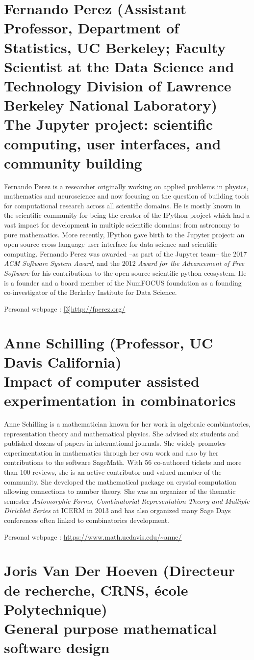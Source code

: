 \documentclass[12pt]{paper}
\newcommand{\orateur}[3]{%
  \section*{%
    #1 {\small(#2)}\nopagebreak\\
    #3}
}
\begin{document}
\orateur
{Fernando Perez}
{Assistant Professor, Department of Statistics, UC Berkeley;
Faculty Scientist at the Data Science and Technology Division of
Lawrence Berkeley National Laboratory}
{The Jupyter project: scientific computing, user interfaces, and community building}

Fernando Perez is a researcher originally working on applied problems
in physics, mathematics and neuroscience and now focusing on the
question of building tools for computational research across all
scientific domains. He is mostly known in the scientific community for
being the creator of the IPython project which had a vast impact for
development in multiple scientific domains: from astronomy to pure
mathematics. More recently, IPython gave birth to the Jupyter project:
an open-source cross-language user interface for data science and
scientific computing. Fernando Perez was awarded --as part of the
Jupyter team-- the 2017 \textit{ACM Software System Award}, and the
2012 \textit{Award for the Advancement of Free Software} for his
contributions to the open source scientific python ecosystem. He is a
founder and a board member of the NumFOCUS foundation as a founding
co-investigator of the Berkeley Institute for Data Science.

Personal webpage : \url{[3]http://fperez.org/}



\orateur
{Anne Schilling}
{Professor, UC Davis California}
{Impact of computer assisted experimentation in combinatorics}

Anne Schilling is a mathematician known for her work in algebraic combinatorics, 
representation theory and mathematical physics. She advised six students and published
dozens of papers in international journals. She widely promotes experimentation 
in mathematics through her own work and also by her contributions to
the software SageMath. With 56 co-authored tickets and more than 100 reviews, she
is an active contributor and valued member of the community. She developed 
the mathematical package on crystal computation allowing connections to number
theory. She was an organizer of the thematic semester \textit{Automorphic Forms, 
Combinatorial Representation Theory and Multiple Dirichlet Series} at ICERM
in 2013 and has also organized many Sage Days conferences often linked to 
combinatorics development.

Personal webpage : \url{https://www.math.ucdavis.edu/~anne/}

\orateur
{Joris Van Der Hoeven}
{Directeur de recherche, CRNS, école Polytechnique}
{General purpose mathematical software design}
\end{document}
